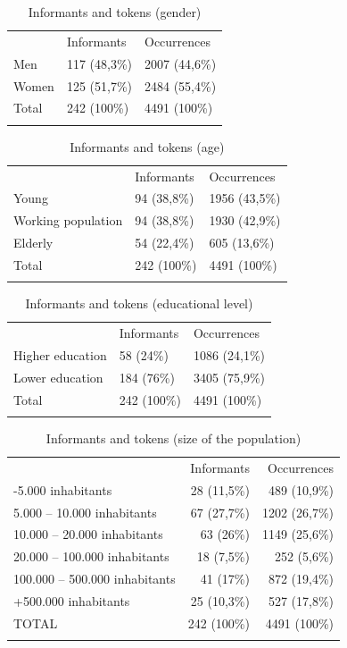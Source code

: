 \documentclass[output=paper]{LSP/langsci}
\begin{document}
\begin{table}
\begin{tabular}{lll} & Informants & Occurrences\\
\lsptoprule
Men & 117 (48,3\%) & 2007 (44,6\%)\\
Women & 125 (51,7\%) & 2484 (55,4\%)\\
Total & 242 (100\%) & 4491 (100\%)\\
\lspbottomrule
\end{tabular}
\label{tab:lara:4}
\caption{Informants and tokens (gender)}
\end{table}

\begin{table}
\begin{tabular}{lll} & Informants & Occurrences\\
\lsptoprule
Young & 94 (38,8\%) & 1956 (43,5\%)\\
Working population & 94 (38,8\%) & 1930 (42,9\%)\\
Elderly & 54 (22,4\%) & 605 (13,6\%)\\
Total & 242 (100\%) & 4491 (100\%)\\
\lspbottomrule
\end{tabular}
\label{tab:lara:5}
\caption{Informants and tokens (age)}
\end{table}

\begin{table}
\begin{tabular}{lll} & Informants & Occurrences\\
\lsptoprule
Higher education & 58 (24\%) & 1086 (24,1\%)\\
Lower education & 184 (76\%) & 3405 (75,9\%)\\
Total & 242 (100\%) & 4491 (100\%)\\
\lspbottomrule
\end{tabular}
\label{tab:lara:6}
\caption{Informants and tokens (educational level)}
\end{table}

\begin{table}
\begin{tabular}{lrr} & Informants & Occurrences\\
\lsptoprule
{}-5.000 inhabitants & 28 (11,5\%) & 489 (10,9\%)\\
5.000 – 10.000 inhabitants & 67 (27,7\%) & 1202 (26,7\%)\\
10.000 – 20.000 inhabitants & 63 (26\%) & 1149 (25,6\%)\\
20.000 – 100.000 inhabitants & 18 (7,5\%) & 252 (5,6\%)\\
100.000 – 500.000 inhabitants & 41 (17\%) & 872 (19,4\%)\\
+500.000 inhabitants & 25 (10,3\%) & 527 (17,8\%)\\
TOTAL & 242 (100\%) & 4491 (100\%)\\
\lspbottomrule
\end{tabular}
\label{tab:lara:7}
\caption{Informants and tokens (size of the population)}
\end{table}
\end{document}
